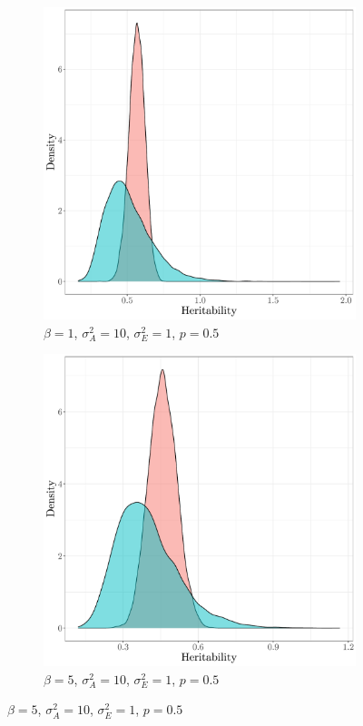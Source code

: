 \begin{figure}
    \centering
    \begin{subfigure}{0.49\textwidth}
    \caption{$\beta=1$, $\sigma^2_A=10$, $\sigma^2_E=1$, $p=0.5$}
    \includegraphics[width=\textwidth]{figures/fixedeffects_gaussian_probit_sA10_p_5_beta_1.pdf}
    \end{subfigure}
    \begin{subfigure}{0.49\textwidth}
    \caption{$\beta=5$, $\sigma^2_A=10$, $\sigma^2_E=1$, $p=0.5$}
    \includegraphics[width=\textwidth]{figures/fixedeffects_gaussian_probit_sA10_p_5_beta_5.pdf}

\end{subfigure}
\end{figure}
